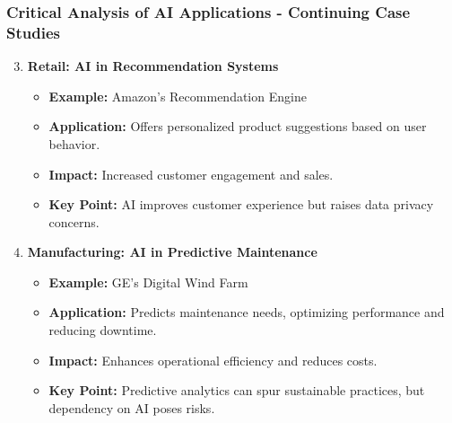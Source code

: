 \documentclass{beamer}
\begin{document}
\begin{frame}[fragile]
    \frametitle{Critical Analysis of AI Applications - Continuing Case Studies}
    \begin{enumerate}
        \setcounter{enumi}{2} %
        \item \textbf{Retail: AI in Recommendation Systems}
            \begin{itemize}
                \item \textbf{Example:} Amazon's Recommendation Engine
                \item \textbf{Application:} Offers personalized product suggestions based on user behavior.
                \item \textbf{Impact:} Increased customer engagement and sales.
                \item \textbf{Key Point:} AI improves customer experience but raises data privacy concerns.
            \end{itemize}

        \item \textbf{Manufacturing: AI in Predictive Maintenance}
            \begin{itemize}
                \item \textbf{Example:} GE's Digital Wind Farm
                \item \textbf{Application:} Predicts maintenance needs, optimizing performance and reducing downtime.
                \item \textbf{Impact:} Enhances operational efficiency and reduces costs.
                \item \textbf{Key Point:} Predictive analytics can spur sustainable practices, but dependency on AI poses risks.
            \end{itemize}
    \end{enumerate}
\end{frame}
\end{document}
